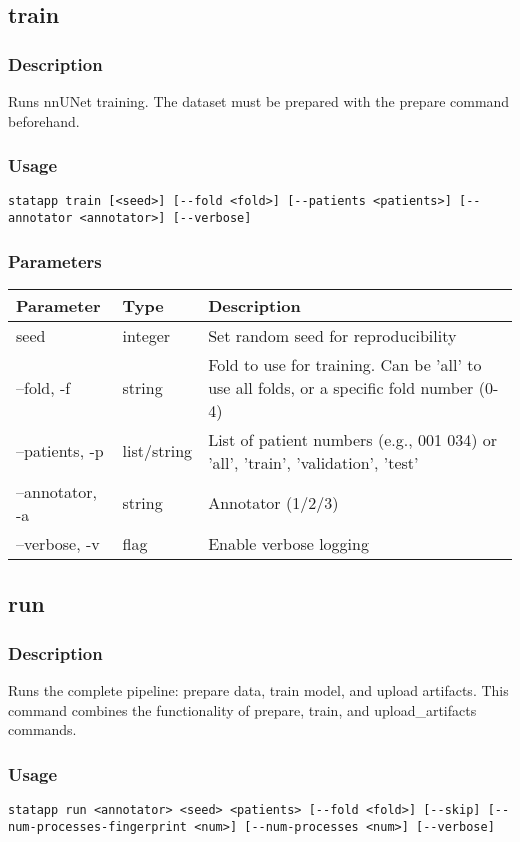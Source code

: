 \documentclass{article}
\begin{document}
\subsection{train}
\subsubsection{Description}
Runs nnUNet training. The dataset must be prepared with the prepare command beforehand.

\subsubsection{Usage}
\begin{lstlisting}
statapp train [<seed>] [--fold <fold>] [--patients <patients>] [--annotator <annotator>] [--verbose]
\end{lstlisting}

\subsubsection{Parameters}
\begin{tabulary}{\linewidth}{LLL}
\toprule
\textbf{Parameter} & \textbf{Type} & \textbf{Description} \\
\midrule
seed & integer & Set random seed for reproducibility \\
--fold, -f & string & Fold to use for training. Can be 'all' to use all folds, or a specific fold number (0-4) \\
--patients, -p & list/string & List of patient numbers (e.g., 001 034) or 'all', 'train', 'validation', 'test' \\
--annotator, -a & string & Annotator (1/2/3) \\
--verbose, -v & flag & Enable verbose logging \\
\bottomrule
\end{tabulary}

\subsection{run}
\subsubsection{Description}
Runs the complete pipeline: prepare data, train model, and upload artifacts. This command combines the functionality of prepare, train, and upload\_artifacts commands.

\subsubsection{Usage}
\begin{lstlisting}
statapp run <annotator> <seed> <patients> [--fold <fold>] [--skip] [--num-processes-fingerprint <num>] [--num-processes <num>] [--verbose]
\end{lstlisting}
\end{document}
